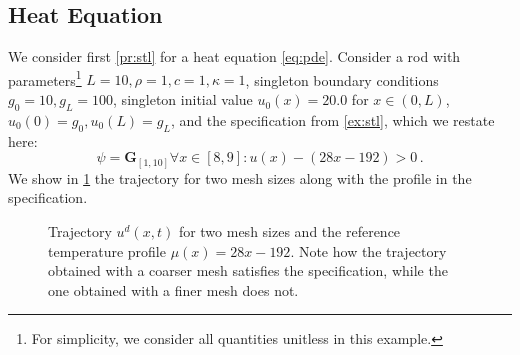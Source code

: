 \documentclass[letterpaper, 10 pt, conference]{ieeeconf/ieeeconf}
\newcommand{\Always}{\mathbf{G}}
\begin{document}
\subsection{Heat Equation}
\label{sub:heat_equation}

We consider first \cref{pr:stl} for a heat equation \cref{eq:pde}.
Consider a rod with parameters\footnote{For simplicity, we consider all
quantities unitless in this example.} $L = 10, \rho = 1, c =
1, \kappa = 1$, singleton boundary conditions $g_0 = 10, g_L = 100$, singleton initial value $u_0(x) = 20.0$
for $x \in (0, L)$, $u_0(0) = g_0, u_0(L) = g_L$, and the specification from
\cref{ex:stl}, which we restate here:
%
\begin{equation}
    \psi = \Always_{[1,10]} \forall x \in [8,9] : u(x) - (28x - 192) > 0 \,.
\end{equation}
%
We show in \cref{fig:ex1_evolution} the trajectory for two mesh sizes along with the
profile in the specification.

\begin{figure}[!t]
    \centering 
        \hfill
        \hfill
    \caption{Trajectory $u^d(x, t)$ for two mesh sizes and the reference
        temperature profile $\mu(x) = 28x - 192$. Note how the trajectory
        obtained with a coarser mesh satisfies the specification, while the one
        obtained with a finer mesh does not.}
    \label{fig:ex1_evolution}
\end{figure}
\end{document}
